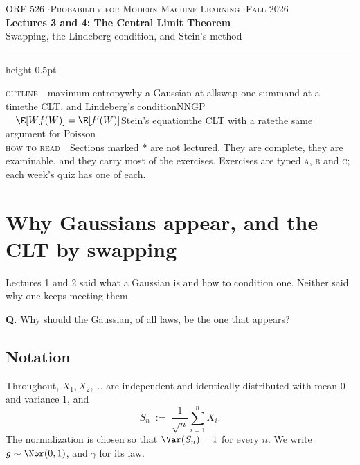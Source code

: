 \documentclass[11pt]{article}
\begin{document}
\begin{center}
{\footnotesize\color{acc}\textsc{ORF 526 \quad$\cdot$\quad Probability for Modern Machine Learning \quad$\cdot$\quad Fall 2026}}\\[0.5em]
{\LARGE\bfseries Lectures 3 and 4: The Central Limit Theorem}\\[0.35em]
{\color{grey} Swapping, the Lindeberg condition, and Stein's method}
\end{center}
\vspace{0.4em}
\hrule height 0.5pt
\vspace{0.6em}

\begin{roadmap}
{\color{acc}\textsc{outline}}\ \ maximum entropy\rmto why a Gaussian at all\rmto swap one summand at a time\rmto the CLT, and Lindeberg's condition\rmto NNGP\\[0.35em]
\ \ $\E[Wf(W)]=\E[f'(W)]$\rmto Stein's equation\rmto the CLT with a rate\rmto the same argument for Poisson\\[0.35em]
{\color{acc}\textsc{how to read}}\ \ Sections marked \textcolor{acc}{$\ast$} are not lectured. They are complete, they are examinable, and they carry most of the exercises. Exercises are typed \textsc{a}, \textsc{b} and \textsc{c}; each week's quiz has one of each.
\end{roadmap}

\section{Why Gaussians appear, and the CLT by swapping}

Lectures 1 and 2 said what a Gaussian is and how to condition one. Neither said why one keeps meeting them.

\begin{question}
\textbf{Q.} Why should the Gaussian, of all laws, be the one that appears?
\end{question}

\subsection{Notation}

Throughout, $X_1,X_2,\dots$ are independent and identically distributed with mean $0$ and variance $1$, and
\[
S_n\;:=\;\frac{1}{\sqrt n}\sum_{i=1}^n X_i .
\]
The normalization is chosen so that $\Var(S_n)=1$ for every $n$. We write $g\sim\Nor(0,1)$, and $\gamma$ for its law.
\end{document}
